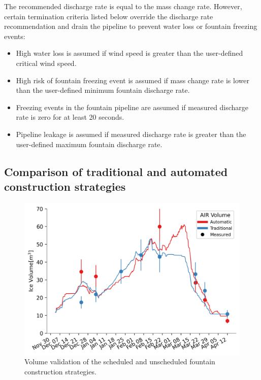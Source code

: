 The recommended discharge rate is equal to the mass change rate. However, certain termination criteria listed
below override the discharge rate recommendation and drain the pipeline to prevent water loss or fountain
freezing events:

\begin{itemize}

	\item High water loss is assumed if wind speed is greater than the user-defined critical wind speed.

	\item High risk of fountain freezing event is assumed if mass change rate is lower than the user-defined minimum fountain discharge rate.

	\item Freezing events in the fountain pipeline are assumed if measured discharge rate is zero for at least 20
	      seconds.

	\item Pipeline leakage is assumed if measured discharge rate is greater than the user-defined maximum fountain discharge rate.

\end{itemize}

\subsection{Comparison of traditional and automated construction strategies}

\begin{figure}[htb] \includegraphics[width=\textwidth] {figs/CH_validation.png} \caption{Volume validation of the
		scheduled and unscheduled fountain construction strategies.} \label{fig:validation} \end{figure}

